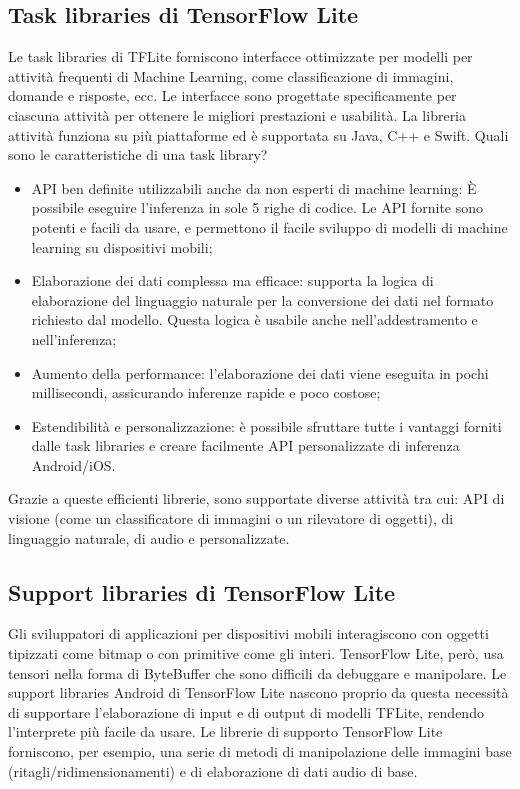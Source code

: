 \subsection{Task libraries di TensorFlow Lite}
Le task libraries di TFLite forniscono interfacce ottimizzate per modelli per attività frequenti di Machine Learning, come classificazione di immagini,
domande e risposte, ecc. Le interfacce sono progettate specificamente per ciascuna attività per ottenere le migliori prestazioni e usabilità. La libreria
attività funziona su più piattaforme ed è supportata su Java, C++ e Swift.
Quali sono le caratteristiche di una task library?
\begin{itemize}
    \item API ben definite utilizzabili anche da non esperti di machine learning: È possibile eseguire l’inferenza in sole 5 righe di codice. Le API
    fornite sono potenti e facili da usare, e permettono il facile sviluppo di modelli di machine learning su dispositivi mobili;
    \item Elaborazione dei dati complessa ma efficace: supporta la logica di elaborazione del linguaggio naturale per la conversione dei dati nel
    formato richiesto dal modello. Questa logica è usabile anche nell’addestramento e nell’inferenza;
    \item Aumento della performance: l’elaborazione dei dati viene eseguita in pochi millisecondi, assicurando inferenze rapide e poco costose;
    \item Estendibilità e personalizzazione: è possibile sfruttare tutte i vantaggi forniti dalle task libraries e creare facilmente API personalizzate
    di inferenza Android/iOS.
\end{itemize}

Grazie a queste efficienti librerie, sono supportate diverse attività tra cui: API di visione (come un classificatore di immagini o un rilevatore di
oggetti), di linguaggio naturale, di audio e personalizzate.

\subsection{Support libraries di TensorFlow Lite}
Gli sviluppatori di applicazioni per dispositivi mobili interagiscono con oggetti tipizzati come bitmap o con primitive come gli interi. TensorFlow Lite,
però, usa tensori nella forma di ByteBuffer che sono difficili da debuggare e manipolare. Le support libraries Android di TensorFlow Lite nascono proprio
da questa necessità di supportare l’elaborazione di input e di output di modelli TFLite, rendendo l’interprete più facile da usare.
Le librerie di supporto TensorFlow Lite forniscono, per esempio, una serie di metodi di manipolazione delle immagini base (ritagli/ridimensionamenti) e
di elaborazione di dati audio di base.

